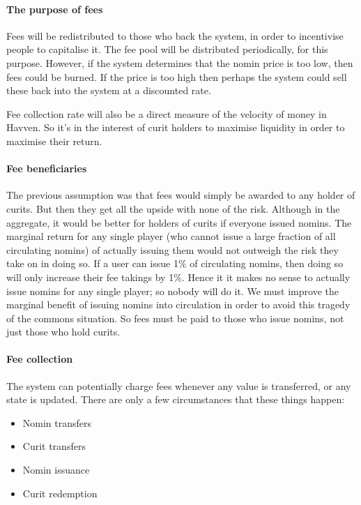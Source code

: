 \documentclass{article}
\begin{document}
\paragraph{The purpose of fees}
Fees will be redistributed to those who back the system, in order to incentivise people to capitalise it.
The fee pool will be distributed periodically, for this purpose.
However, if the system determines that the nomin price is too low, then fees could be burned. If the price is
too high then perhaps the system could sell these back into the system at a discounted rate.

Fee collection rate will also be a direct measure of the velocity of money in Havven. So it's in the interest
of curit holders to maximise liquidity in order to maximise their return.

\paragraph{Fee beneficiaries}
The previous assumption was that fees would simply be awarded to any holder of curits. But then they
get all the upside with none of the risk. Although in the aggregate, it would be better for holders of 
curits if everyone issued nomins. The marginal return for any single player (who cannot issue a 
large fraction of all circulating nomins) of actually issuing them would not outweigh the risk they take
on in doing so. If a user can issue 1\% of circulating nomins, then doing so will only increase their
fee takings by 1\%.
Hence it it makes no sense to actually issue nomins for any single player; so nobody will do it.
We must improve the marginal benefit of issuing nomins into circulation in order to avoid
this tragedy of the commons situation. So fees must be paid to those who issue nomins, not just
those who hold curits.

\paragraph{Fee collection}
The system can potentially charge fees whenever any value is transferred, or any state is updated.
There are only a few circumstances that these things happen:
\begin{itemize}
    \item Nomin transfers
    \item Curit transfers
    \item Nomin issuance
    \item Curit redemption
\end{itemize}
\end{document}
